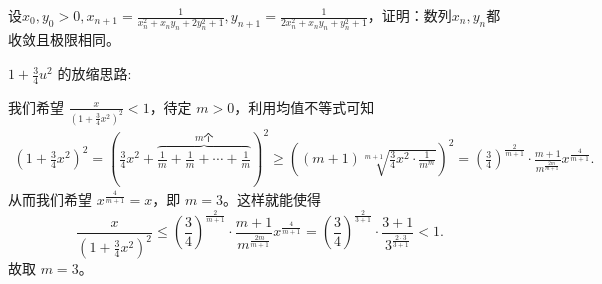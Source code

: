 \documentclass[../../main.tex]{subfiles}%
\begin{document}
\begin{example}
设\(x_0,y_0 > 0,x_{n + 1}=\frac{1}{x_n^2 + x_ny_n + 2y_n^2 + 1},y_{n + 1}=\frac{1}{2x_n^2 + x_ny_n + y_n^2 + 1}\)，证明：数列\(x_n,y_n\)都收敛且极限相同。
\end{example}
\begin{remark}
\hypertarget{均值放缩的思路}{\(1+\frac{3}{4}u^2\) 的放缩思路:}我们希望 \(\frac{x}{(1+\frac{3}{4}x^2)^2}<1\)，待定 \(m > 0\)，利用均值不等式可知
\begin{align*}
\left(1+\frac{3}{4}x^2\right)^2=\left(\frac{3}{4}x^2+\overbrace{\frac{1}{m}+\frac{1}{m}+\cdots +\frac{1}{m}}^{m\text{个}}\right)^2
\geqslant \left((m + 1)\sqrt[m + 1]{\frac{3}{4}x^2\cdot\frac{1}{m^m}}\right)^2
=\left(\frac{3}{4}\right)^{\frac{2}{m + 1}}\cdot\frac{m + 1}{m^{\frac{2m}{m + 1}}}x^{\frac{4}{m + 1}}.
\end{align*}
从而我们希望 \(x^{\frac{4}{m + 1}} = x\)，即 \(m = 3\)。这样就能使得
\[
\frac{x}{(1+\frac{3}{4}x^2)^2}\leqslant \left(\frac{3}{4}\right)^{\frac{2}{m + 1}}\cdot\frac{m + 1}{m^{\frac{2m}{m + 1}}}x^{\frac{4}{m + 1}}=\left(\frac{3}{4}\right)^{\frac{2}{3 + 1}}\cdot\frac{3 + 1}{3^{\frac{2\cdot 3}{3 + 1}}}<1.
\]
故取 \(m = 3\)。
\end{remark}
\end{document}
